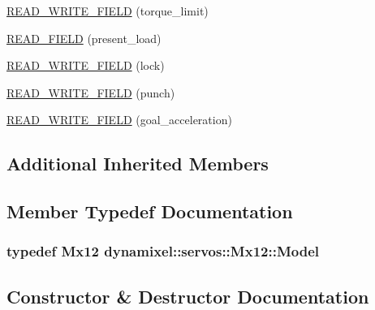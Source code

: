 \begin{DoxyCompactItemize}
\item 
\hyperlink{classdynamixel_1_1servos_1_1_mx12_a518740e0e15f074ae044560e9de2712e}{R\+E\+A\+D\+\_\+\+W\+R\+I\+T\+E\+\_\+\+F\+I\+E\+LD} (torque\+\_\+limit)
\item 
\hyperlink{classdynamixel_1_1servos_1_1_mx12_a88c1c23ca7209a40558baaeb958c8a81}{R\+E\+A\+D\+\_\+\+F\+I\+E\+LD} (present\+\_\+load)
\item 
\hyperlink{classdynamixel_1_1servos_1_1_mx12_a1d4c379c1bbb9b45cc92e634400503f1}{R\+E\+A\+D\+\_\+\+W\+R\+I\+T\+E\+\_\+\+F\+I\+E\+LD} (lock)
\item 
\hyperlink{classdynamixel_1_1servos_1_1_mx12_a8bfe033ee6cc49243b4cea73141e67f4}{R\+E\+A\+D\+\_\+\+W\+R\+I\+T\+E\+\_\+\+F\+I\+E\+LD} (punch)
\item 
\hyperlink{classdynamixel_1_1servos_1_1_mx12_a18adf90247e456e835bde148448f00b8}{R\+E\+A\+D\+\_\+\+W\+R\+I\+T\+E\+\_\+\+F\+I\+E\+LD} (goal\+\_\+acceleration)
\end{DoxyCompactItemize}
\subsection*{Additional Inherited Members}


\subsection{Member Typedef Documentation}
\subsubsection[{\texorpdfstring{Model}{Model}}]{\setlength{\rightskip}{0pt plus 5cm}typedef {\bf Mx12} {\bf dynamixel\+::servos\+::\+Mx12\+::\+Model}}\hypertarget{classdynamixel_1_1servos_1_1_mx12_a9b2d42b5b11f156e97e0cb7b757dc7af}{}\label{classdynamixel_1_1servos_1_1_mx12_a9b2d42b5b11f156e97e0cb7b757dc7af}


\subsection{Constructor \& Destructor Documentation}
